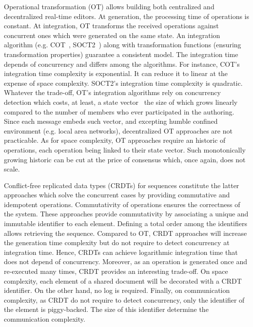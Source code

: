 \begin{asparadesc}
\item [Operational transformation] (OT) allows building both centralized and
  decentralized real-time editors. At generation, the processing time of
  operations is constant. At integration, OT transforms the received operations
  against concurrent ones which were generated on the same state. An integration
  algorithm (e.g. COT~\cite{sun2009contextbased}, SOCT2~\cite{vidot200copies})
  along with transformation functions (ensuring transformation properties)
  guarantee a consistent model. The integration time depends of concurrency and
  differs among the algorithms.  For instance, COT's integration time complexity
  is exponential. It can reduce it to linear at the expense of space
  complexity. SOCT2's integration time complexity is quadratic.  Whatever the
  trade-off, OT's integration algorithms rely on concurrency detection which
  costs, at least, a state vector~\cite{charronbost1991concerning} the size of
  which grows linearly compared to the number of members who ever participated
  in the authoring. Since each message embeds such vector, and excepting humble
  confined environment (e.g. local area networks), decentralized OT approaches
  are not practicable. As for space complexity, OT approaches require an
  historic of operations, each operation being linked to their state
  vector. Such monotonically growing historic can be cut at the price of
  consensus which, once again, does not scale.

\item [Conflict-free replicated data types] (CRDTs) for sequences constitute the
  latter approaches which solve the concurrent cases by providing commutative
  and idempotent operations. Commutativity of operations ensures the correctness
  of the system. These approaches provide commutativity by associating a unique
  and immutable identifier to each element. Defining a total order among the
  identifiers allows retrieving the sequence. Compared to OT, CRDT approaches
  will increase the generation time complexity but do not require to detect
  concurrency at integration time. Hence, CRDTs can achieve logarithmic
  integration time that does not depend of concurrency. Moreover, as an
  operation is generated once and re-executed many times, CRDT provides an
  interesting trade-off. On space complexity, each element of a shared document
  will be decorated with a CRDT identifier. On the other hand, no log is
  required. Finally, on communication complexity, as CRDT do not require to
  detect concurrency, only the identifier of the element is piggy-backed. The
  size of this identifier determine the communication complexity.


\end{asparadesc}
